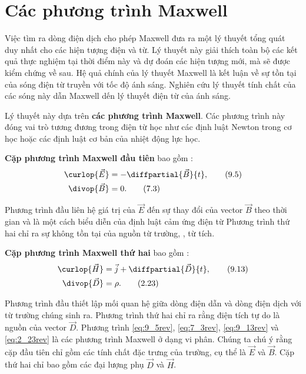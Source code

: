 \section{Các phương trình Maxwell}\label{sec:9_3}

Việc tìm ra dòng điện dịch cho phép Maxwell đưa ra một lý thuyết tổng quát duy nhất cho các hiện tượng điện và từ.
Lý thuyết này giải thích toàn bộ các kết quả thực nghiệm tại thời điểm này và dự đoán các hiện tượng mới, mà sẽ được kiểm chứng về sau.
Hệ quả chính của lý thuyết Maxwell là kết luận về sự tồn tại của sóng điện từ truyền với tốc độ ánh sáng.
Nghiên cứu lý thuyết tính chất của các sóng này dẫn Maxwell dến lý thuyết điện từ của ánh sáng.

Lý thuyết này dựa trên \textbf{các phương trình Maxwell}.
Các phương trình này đóng vai trò tương đương trong điện từ học như các định luật Newton trong cơ học hoặc các định luật cơ bản của nhiệt động lực học.

\textbf{Cặp phương trình Maxwell đầu tiên} bao gồm :
\begin{align}
    \curlop{\vec{E}} &= - \diffpartial{\vec{B}}{t},\label{eq:9_5rev} \tag{9.5}\\
    \divop{\vec{B}} &= 0.\label{eq:7_3rev} \tag{7.3}
\end{align}

\noindent
Phương trình đầu liên hệ giá trị của $\vec{E}$ đến sự thay đổi của vector $\vec{B}$ theo thời gian và là một cách biểu diễn của định luật cảm ứng điện từ
Phương trình thứ hai chỉ ra sự không tồn tại của nguồn từ trường, \ie, từ tích.

\textbf{Cặp phương trình Maxwell thứ hai} bao gồm :
\begin{align*}
    \curlop{\vec{H}} &= \vec{j} + \diffpartial{\vec{D}}{t},\label{eq:9_13rev} \tag{9.13}\\
    \divop{\vec{D}} &= \rho.\label{eq:2_23rev} \tag{2.23}
\end{align*}

\noindent
Phương trình đầu thiết lập mối quan hệ giữa dòng điện dẫn và dòng điện dịch với từ trường chúng sinh ra.
Phương trình thứ hai chỉ ra rằng điện tích tự do là nguồn của vector $\vec{D}$.
Phương trình \eqref{eq:9_5rev}, \eqref{eq:7_3rev}, \eqref{eq:9_13rev} và \eqref{eq:2_23rev} là các phương trình Maxwell ở dạng vi phân.
Chúng ta chú ý rằng cặp đầu tiên chỉ gồm các tính chất đặc trưng của trường, cụ thể là $\vec{E}$ và $\vec{B}$.
Cặp thứ hai chỉ bao gồm các đại lượng phụ $\vec{D}$ và $\vec{H}$.

